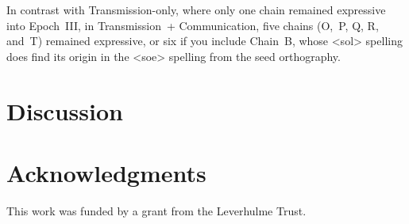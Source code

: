 \documentclass[doc,biblatex]{apa7}
\begin{document}
In contrast with Transmission-only, where only one chain remained expressive into Epoch~III, in Transmission~+ Communication, five chains (O,~P, Q, R, and~T) remained expressive, or six if you include Chain~B, whose <sol> spelling does find its origin in the <soe> spelling from the seed orthography.


\section{Discussion}


\section{Acknowledgments}

\noindent This work was funded by a grant from the Leverhulme Trust.

\printbibliography
\end{document}
